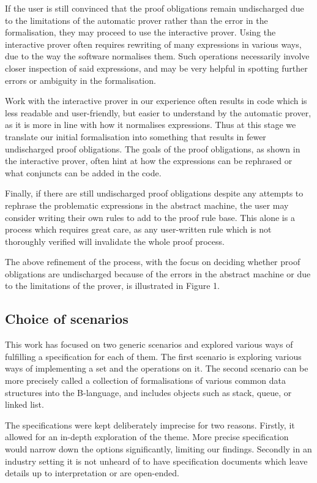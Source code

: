\documentclass[11pt,journal]{IEEEtran}
\begin{document}
	If the user is still convinced that the proof obligations remain undischarged due to the limitations of the automatic prover rather than the error in the formalisation, they may proceed to use the interactive prover. Using the interactive prover often requires rewriting of many expressions in various ways, due to the way the software normalises them. Such operations necessarily involve closer inspection of said expressions, and may be very helpful in spotting further errors or ambiguity in the formalisation.
	
	Work with the interactive prover in our experience often results in code which is less readable and user-friendly, but easier to understand by the automatic prover, as it is more in line with how it normalises expressions. Thus at this stage we translate our initial formalisation into something that results in fewer undischarged proof obligations. The goals of the proof obligations, as shown in the interactive prover, often hint at how the expressions can be rephrased or what conjuncts can be added in the code. 
	
	Finally, if there are still undischarged proof obligations despite any attempts to rephrase the problematic expressions in the abstract machine, the user may consider writing their own rules to add to the proof rule base. This alone is a process which requires great care, as any user-written rule which is not thoroughly verified will invalidate the whole proof process. 
	
	The above refinement of the process, with the focus on deciding whether proof obligations are undischarged because of the errors in the abstract machine or due to the limitations of the prover, is illustrated in Figure 1.


	\subsection{Choice of scenarios}
	This work has focused on two generic scenarios and explored various ways of fulfilling a specification for each of them. The first scenario is exploring various ways of implementing a set and the operations on it. The second scenario can be more precisely called a collection of formalisations of various common data structures into the B-language, and includes objects such as stack, queue, or linked list.
	
	The specifications were kept deliberately imprecise for two reasons. Firstly, it allowed for an in-depth exploration of the theme. More precise specification would narrow down the options significantly, limiting our findings. Secondly in an industry setting it is not unheard of to have specification documents which leave details up to interpretation or are open-ended. 
	
\end{document}

